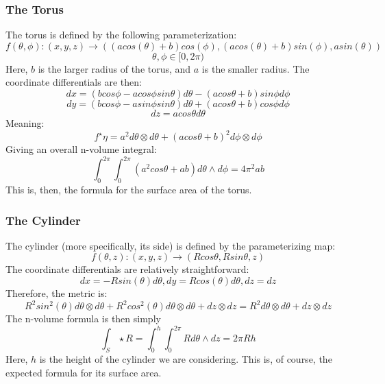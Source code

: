 \documentclass{article}
\begin{document}
\subsubsection{The Torus}
The torus is defined by the following parameterization:
\[
f(\theta,\phi): (x,y,z) \rightarrow ((a cos(\theta)+b)cos(\phi), (a cos(\theta)+b)sin(\phi), a sin(\theta))
\]
\[
\theta, \phi \in [0, 2\pi)
\]
Here, $b$ is the larger radius of the torus, and $a$ is the smaller radius. The coordinate differentials are then:
\[
dx = (b cos\phi - a cos\phi sin\theta)d\theta - (a cos\theta+b)sin\phi d\phi
\]
\[
dy = (b cos\phi - a sin\phi sin\theta)d\theta + (a cos\theta + b)cos\phi d\phi
\]
\[
dz = a cos\theta d\theta
\]
Meaning:
\[
f^{\star}\eta = a^2 d\theta \otimes d\theta + (a cos \theta + b)^2 d\phi \otimes d\phi
\]
Giving an overall n-volume integral:
\[
\int_{0}^{2\pi}\int_{0}^{2\pi}(a^2 cos\theta + ab) d\theta \wedge d\phi = 4\pi^2ab
\]
This is, then, the formula for the surface area of the torus.

\subsubsection{The Cylinder}
The cylinder (more specifically, its side) is defined by the parameterizing map:
\[
f(\theta, z): (x,y,z) \rightarrow (R cos\theta, R sin\theta, z)
\]
The coordinate differentials are relatively straightforward:
\[
dx = -R sin(\theta) d\theta, dy = R cos(\theta) d\theta, dz = dz
\]
Therefore, the metric is:
\[
R^2 sin^2(\theta) d\theta \otimes d\theta + R^2 cos^2(\theta) d\theta \otimes d\theta + dz \otimes dz = R^2 d\theta \otimes d\theta + dz \otimes dz
\]
The n-volume formula is then simply
\[
\int_S \star R = \int_{0}^{h}\int_{0}^{2\pi} R d\theta \wedge dz = 2\pi Rh
\]
Here, $h$ is the height of the cylinder we are considering. This is, of course, the expected formula for its surface area.
\end{document}
